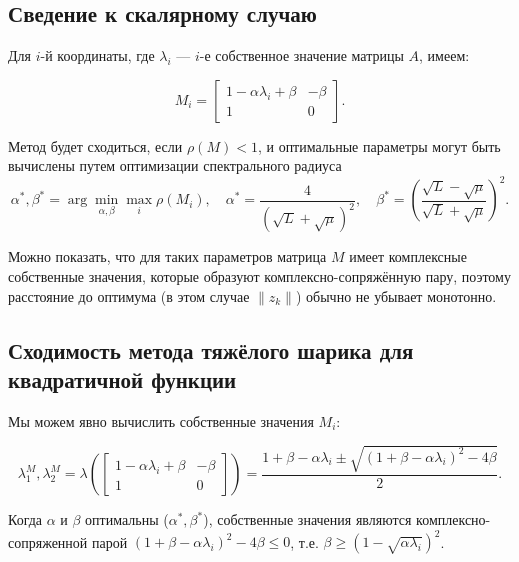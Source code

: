 \documentclass[
  russian,
  letterpaper,
  DIV=11,
  numbers=noendperiod]{scrartcl}
\begin{document}
\subsection{Сведение к скалярному
случаю}\label{ux441ux432ux435ux434ux435ux43dux438ux435-ux43a-ux441ux43aux430ux43bux44fux440ux43dux43eux43cux443-ux441ux43bux443ux447ux430ux44e-1}

Для \(i\)-й координаты, где \(\lambda_i\) --- \(i\)-е собственное
значение матрицы \(A\), имеем:

\[
M_i = \begin{bmatrix} 
1 - \alpha \lambda_i + \beta & -\beta \\
1 & 0
\end{bmatrix}.
\]

Метод будет сходиться, если \(\rho(M) < 1\), и оптимальные параметры
могут быть вычислены путем оптимизации спектрального радиуса \[
\alpha^*, \beta^* = \arg \min_{\alpha, \beta} \max_{i} \rho(M_i), \quad \alpha^* = \dfrac{4}{(\sqrt{L} + \sqrt{\mu})^2}, \quad \beta^* = \left(\dfrac{\sqrt{L} - \sqrt{\mu}}{\sqrt{L} + \sqrt{\mu}}\right)^2.
\]

Можно показать, что для таких параметров матрица \(M\) имеет комплексные
собственные значения, которые образуют комплексно-сопряжённую пару,
поэтому расстояние до оптимума (в этом случае \(\| z_k \|\)) обычно не
убывает монотонно.

\subsection{Сходимость метода тяжёлого шарика для квадратичной
функции}\label{ux441ux445ux43eux434ux438ux43cux43eux441ux442ux44c-ux43cux435ux442ux43eux434ux430-ux442ux44fux436ux451ux43bux43eux433ux43e-ux448ux430ux440ux438ux43aux430-ux434ux43bux44f-ux43aux432ux430ux434ux440ux430ux442ux438ux447ux43dux43eux439-ux444ux443ux43dux43aux446ux438ux438}

Мы можем явно вычислить собственные значения \(M_i\):

\[
\lambda^M_1, \lambda^M_2 = \lambda \left( \begin{bmatrix} 
1 - \alpha \lambda_i + \beta & -\beta \\
1 & 0
\end{bmatrix}\right) = \dfrac{1+\beta - \alpha \lambda_i \pm \sqrt{(1+\beta - \alpha\lambda_i)^2 - 4\beta}}{2}.
\]

Когда \(\alpha\) и \(\beta\) оптимальны (\(\alpha^*, \beta^*\)),
собственные значения являются комплексно-сопряженной парой
\((1+\beta - \alpha\lambda_i)^2 - 4\beta \leq 0\), т.е.
\(\beta \geq (1 - \sqrt{\alpha \lambda_i})^2\).
\end{document}
